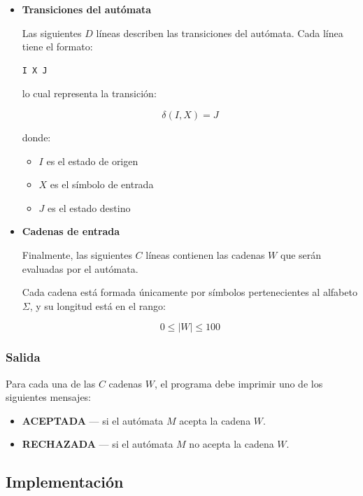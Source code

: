 \documentclass[12pt]{article}
\begin{document}
\begin{itemize}
\item \textbf{Transiciones del autómata}

Las siguientes $D$ líneas describen las transiciones del autómata.  
Cada línea tiene el formato:

\begin{verbatim}
I X J
\end{verbatim}

lo cual representa la transición:

\[
\delta(I, X) = J
\]

donde:

\begin{itemize}

\item $I$ es el estado de origen
\item $X$ es el símbolo de entrada
\item $J$ es el estado destino

\end{itemize}

\item \textbf{Cadenas de entrada}

Finalmente, las siguientes $C$ líneas contienen las cadenas $W$ que serán evaluadas por el autómata.  

Cada cadena está formada únicamente por símbolos pertenecientes al alfabeto $\Sigma$, y su longitud está en el rango:

\[
0 \leq |W| \leq 100
\]

\end{itemize}

\subsubsection{Salida}

Para cada una de las $C$ cadenas $W$, el programa debe imprimir uno de los siguientes mensajes:

\begin{itemize}

\item \textbf{ACEPTADA} — si el autómata $M$ acepta la cadena $W$.
\item \textbf{RECHAZADA} — si el autómata $M$ no acepta la cadena $W$.

\end{itemize}

\subsection{Implementación}
\end{document}
